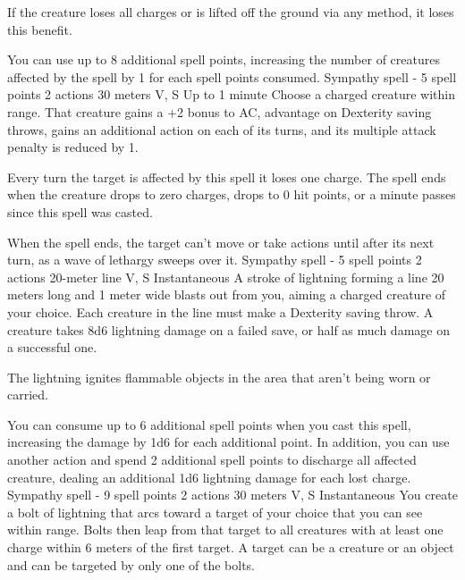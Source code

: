         If the creature loses all charges or is lifted off the ground via any method, it loses this benefit.

        You can use up to 8 additional spell points, increasing the number of creatures affected by the spell by 1 for each spell points consumed.
        {Sympathy spell - 5 spell points}
        {2 actions}
        {30 meters}
        {V, S}
        {Up to 1 minute}
        Choose a charged creature within range.
        That creature gains a +2 bonus to AC, advantage on Dexterity saving throws, gains an additional action on each of its turns, and its multiple attack penalty is reduced by 1.

        Every turn the target is affected by this spell it loses one charge.
        The spell ends when the creature drops to zero charges, drops to 0 hit points, or a minute passes since this spell was casted.

        When the spell ends, the target can't move or take actions until after its next turn, as a wave of lethargy sweeps over it.
        {Sympathy spell - 5 spell points}
        {2 actions}
        {20-meter line}
        {V, S}
        {Instantaneous}
        A stroke of lightning forming a line 20 meters long and 1 meter wide blasts out from you, aiming a charged creature of your choice.
        Each creature in the line must make a Dexterity saving throw.
        A creature takes 8d6 lightning damage on a failed save, or half as much damage on a successful one.

        The lightning ignites flammable objects in the area that aren't being worn or carried.

        You can consume up to 6 additional spell points when you cast this spell, increasing the damage by 1d6 for each additional point.
        In addition, you can use another action and spend 2 additional spell points to discharge all affected creature, dealing an additional 1d6 lightning damage for each lost charge.
        {Sympathy spell - 9 spell points}
        {2 actions}
        {30 meters}
        {V, S}
        {Instantaneous}
        You create a bolt of lightning that arcs toward a target of your choice that you can see within range.
        Bolts then leap from that target to all creatures with at least one charge within 6 meters of the first target.
        A target can be a creature or an object and can be targeted by only one of the bolts.

